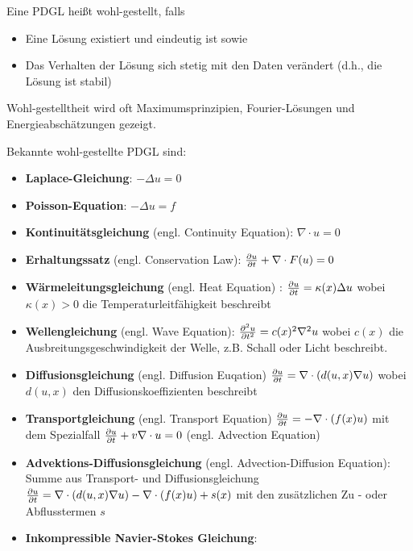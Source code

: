 \begin{definition}
	Eine PDGL heißt wohl-gestellt, falls
	\begin{itemize}[noitemsep]
		\item Eine Lösung existiert und eindeutig ist sowie
		\item Das Verhalten der Lösung sich stetig mit den Daten verändert (d.h., die Lösung ist stabil)
	\end{itemize}
	Wohl-gestelltheit wird oft Maximumsprinzipien, Fourier-Lösungen und Energieabschätzungen gezeigt.
\end{definition}

\begin{definition}
	Bekannte wohl-gestellte PDGL sind:
	\begin{itemize}[noitemsep]
		\item \textbf{Laplace-Gleichung}: $-\Delta u = 0$
		\item \textbf{Poisson-Equation}: $-\Delta u = f$
		\item \textbf{Kontinuitätsgleichung} (engl. Continuity Equation): $\nabla \cdot u = 0$
		\item  \textbf{Erhaltungssatz} (engl. Conservation Law): $\frac{\partial u}{\partial t} + \nabla \cdot F(u) = 0$
		\item \textbf{Wärmeleitungsgleichung} (engl. Heat Equation) :  $\frac{\partial u}{\partial t} = \kappa(x) \Delta u$ wobei $\kappa(x) > 0$ die  Temperaturleitfähigkeit beschreibt
		\item \textbf{Wellengleichung} (engl. Wave Equation): $\frac{\partial ^2 u}{\partial t^2} = c(x)^2 \nabla^2 u $ wobei $c(x)$ die Ausbreitungsgeschwindigkeit der Welle, z.B. Schall oder Licht beschreibt.
		\item \textbf{Diffusionsgleichung} (engl. Diffusion Euqation) $\frac{\partial u}{\partial t} = \nabla \cdot (d(u, x) \nabla u) $ wobei $d(u,x)$ den Diffusionskoeffizienten beschreibt
		\item \textbf{Transportgleichung} (engl. Transport Equation) $\frac{\partial u}{\partial t} = - \nabla \cdot (f(x) u)$ mit dem Spezialfall $\frac{\partial u}{\partial t} + v \nabla \cdot u = 0$ (engl. Advection Equation)
		\item \textbf{Advektions-Diffusionsgleichung} (engl. Advection-Diffusion Equation): Summe aus Transport- und Diffusionsgleichung $\frac{\partial u}{\partial t} = \nabla \cdot (d(u, x) \nabla u) - \nabla \cdot (f(x) u) + s(x) $ mit den zusätzlichen Zu - oder Abflusstermen $s$
		\item \textbf{Inkompressible Navier-Stokes Gleichung}: 
		\begin{align*}

\end{align*}
\end{itemize}
\end{definition}
